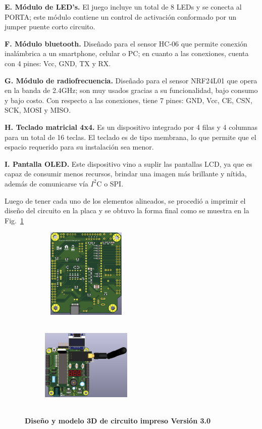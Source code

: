 \documentclass[times, 10pt,twocolumn]{article}
\begin{document}
\textbf{E. Módulo de LED's.} El juego incluye un total de 8 LEDs y se conecta al   PORTA; este módulo contiene un control de activación conformado por un jumper puente corto circuito.

 \textbf{F. Módulo bluetooth.} Diseñado para el sensor HC-06 que permite conexión inalámbrica a un smartphone, celular o PC; en cuanto a las conexiones, cuenta con 4 pines: Vcc, GND, TX y RX.
  
 \textbf{G. Módulo de radiofrecuencia.} Diseñado para el sensor NRF24L01 que opera en la banda de 2.4GHz; son muy usados gracias a su funcionalidad, bajo consumo y bajo costo. Con respecto a las conexiones, tiene 7 pines: GND, Vcc, CE, CSN, SCK, MOSI y MISO.
  
 \textbf{H. Teclado matricial 4x4. } Es un dispositivo integrado por 4 filas y 4 columnas para un total de 16 teclas. El teclado es de tipo membrana, lo que permite que el espacio requerido para su instalación sea menor.
 
 \textbf{I. Pantalla OLED.} Este dispositivo vino a suplir las pantallas LCD, ya
que es capaz de consumir menos recursos, brindar una imagen más brillante y nítida, además de comunicarse vía $I^{2}$C o SPI.



Luego de tener cada uno de los elementos alineados, se procedió a imprimir el diseño del circuito en la placa y se obtuvo la forma final como se muestra en la Fig.~\ref{fig:11}

\begin{figure}[H]
  \begin{subfigure}[b]{0.4\columnwidth}
    \includegraphics[width=4.3cm, height=4.3cm]{Img/tercera_version_pcb_b.png}
  \end{subfigure}
    \hspace{0.7cm}
  \begin{subfigure}[b]{0.4\columnwidth}
     \includegraphics[width=4.3cm, height=4.3cm]{Img/tercera_version_3d.png}
  \end{subfigure}
   \caption{\centering \textbf{Diseño y modelo 3D de circuito impreso Versión 3.0}} 
   \label{fig:11}
 \end{figure}
\end{document}
